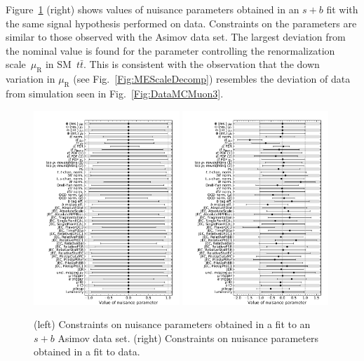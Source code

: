 Figure~\ref{Fig:Constraints} (right) shows values of nuisance parameters obtained in an $s+b$ fit with the same signal hypothesis performed on data.
Constraints on the parameters are similar to those observed with the Asimov data set.
The largest deviation from the nominal value is found for the parameter controlling the renormalization scale~$\mu_\text{R}$ in SM~$t\bar{t}$.
This is consistent with the observation that the down variation in $\mu_\text{R}$ (see Fig.~\ref{Fig:MEScaleDecomp}) resembles the deviation of data from simulation seen in Fig.~\ref{Fig:DataMCMuon3}.
\begin{figure}
  \centering
  \includegraphics[width=0.49\textwidth]{fig/chapt7/stat/constraints_blind.pdf}
  \includegraphics[width=0.49\textwidth]{fig/chapt7/stat/constraints.pdf}
  \caption{(left) Constraints on nuisance parameters obtained in a fit to an $s+b$ Asimov data set. (right) Constraints on nuisance parameters obtained in a fit to data.}
  \label{Fig:Constraints}
\end{figure}

